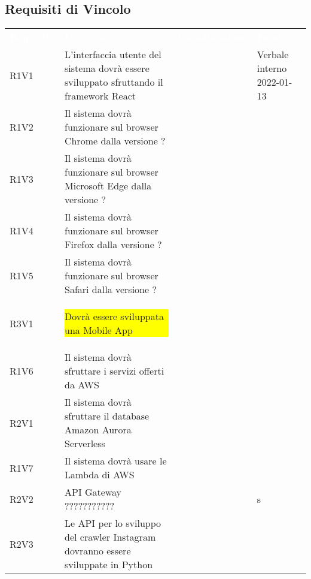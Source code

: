 \subsection{Requisiti di Vincolo}


\renewcommand{\arraystretch}{1.5}
\begin{longtable}{ m{}<{\centering}  m{}<{\centering}  m{}<{\centering}  m{}<{\centering}}
	\rowcolor{darkblue}
	\textcolor{white}{\textbf{Requisito}} &\textcolor{white}{\textbf{Descrizione}}& \textcolor{white}{\textbf{Classificazione}} & \textcolor{white}{\textbf{Fonti}}\\ 

	R1V1 & L’interfaccia utente del sistema dovrà essere sviluppato sfruttando il framework React & \Ob & Verbale interno 2022-01-13 \\	

	R1V2 & Il sistema dovrà funzionare sul browser Chrome dalla versione ? & \Ob & \Vi \\	
	 
	R1V3 & Il sistema dovrà funzionare sul browser Microsoft Edge dalla versione ? & \Ob & \Vi \\	

	R1V4 & Il sistema dovrà funzionare sul browser Firefox dalla versione ? & \Ob & \Vi \\	
	 
	R1V5 & Il sistema dovrà funzionare sul browser Safari dalla versione ? & \Ob & \Vi \\	
	 
	R3V1 & {\colorbox{yellow}{\parbox{0.35\textwidth}{Dovrà essere sviluppata una Mobile App}}} & \Fa & \Ca \\	
	 
	R1V6 & Il sistema dovrà sfruttare i servizi offerti da AWS & \Ob & \Ca \\	
	 
	R2V1 & Il sistema dovrà sfruttare il database Amazon Aurora Serverless & \De & \Vi \\
	
	R1V7 & Il sistema dovrà usare le Lambda di AWS & \Ob & \Ca \\	
	 
	R2V2 & API Gateway ??????????? & \De & s\\	 

	R2V3 & Le API per lo sviluppo del crawler Instagram dovranno essere sviluppate in Python & \De & \Vi \\	
	 

\end{longtable}
